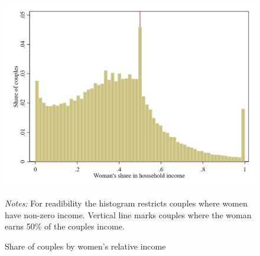 \begin{figure}[H]
\centering
\caption{Share of couples by women's relative income}
\label{fig:figure_1}
\includegraphics[width=.5\textwidth]{../../results/figures/figure_1.png}
\par \begin{minipage}[h]{\textwidth}{\scriptsize\textit{Notes:} For readibility the histogram restricts couples where women have non-zero income. Vertical line marks couples where the woman earns 50\% of the couples income.}\end{minipage}
\end{figure}
